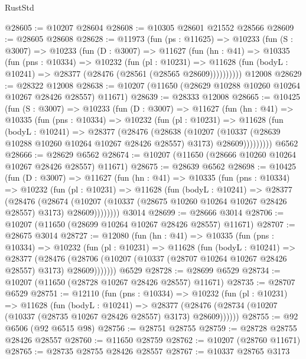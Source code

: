 \begin{lexlean}{RustStd}
\begin{coremodule}
@28605 := @10207 @28604
@28608 := @10305 @28601 @21552 @28566
@28609 := @28605 @28608
@28628 := @11973
    (fun (ps : @11625) =>
    @10233
      (fun (S : @3007) =>
      @10233
        (fun (D : @3007) =>
        @11627
          (fun (hn : @41) =>
          @10335
            (fun (pns : @10334) =>
            @10232
              (fun (pl : @10231) =>
              @11628 (fun (bodyL : @10241) => @28377 (@28476 (@28561 (@28565 @28609))))))))))
    @12008
@28629 := @28322 @12008
@28638 := @10207 (@11650 (@28629 @10288 @10260 @10264 @10267 @28426 @28557) @11671)
@28639 := @28333 @12008
@28665 := @10425
    (fun (S : @3007) =>
    @10233
      (fun (D : @3007) =>
      @11627
        (fun (hn : @41) =>
        @10335
          (fun (pns : @10334) =>
          @10232
            (fun (pl : @10231) =>
            @11628
              (fun (bodyL : @10241) =>
              @28377
                (@28476
                  (@28638
                    (@10207
                      (@10337 (@28639 @10288 @10260 @10264 @10267 @28426 @28557) @3173)
                      @28609)))))))))
    @6562
@28666 := @28629 @6562
@28674 := @10207 (@11650 (@28666 @10260 @10264 @10267 @28426 @28557) @11671)
@28675 := @28639 @6562
@28698 := @10425
    (fun (D : @3007) =>
    @11627
      (fun (hn : @41) =>
      @10335
        (fun (pns : @10334) =>
        @10232
          (fun (pl : @10231) =>
          @11628
            (fun (bodyL : @10241) =>
            @28377
              (@28476
                (@28674
                  (@10207 (@10337 (@28675 @10260 @10264 @10267 @28426 @28557) @3173) @28609))))))))
    @3014
@28699 := @28666 @3014
@28706 := @10207 (@11650 (@28699 @10264 @10267 @28426 @28557) @11671)
@28707 := @28675 @3014
@28727 := @12080
    (fun (hn : @41) =>
    @10335
      (fun (pns : @10334) =>
      @10232
        (fun (pl : @10231) =>
        @11628
          (fun (bodyL : @10241) =>
          @28377
            (@28476
              (@28706 (@10207 (@10337 (@28707 @10264 @10267 @28426 @28557) @3173) @28609)))))))
    @6529
@28728 := @28699 @6529
@28734 := @10207 (@11650 (@28728 @10267 @28426 @28557) @11671)
@28735 := @28707 @6529
@28751 := @12110
    (fun (pns : @10334) =>
    @10232
      (fun (pl : @10231) =>
      @11628
        (fun (bodyL : @10241) =>
        @28377 (@28476 (@28734 (@10207 (@10337 (@28735 @10267 @28426 @28557) @3173) @28609))))))
@28755 := @92 @6506 (@92 @6515 @98)
@28756 := @28751 @28755
@28759 := @28728 @28755 @28426 @28557
@28760 := @11650 @28759
@28762 := @10207 (@28760 @11671)
@28765 := @28735 @28755 @28426 @28557
@28767 := @10337 @28765 @3173

\end{coremodule}
\end{lexlean}
